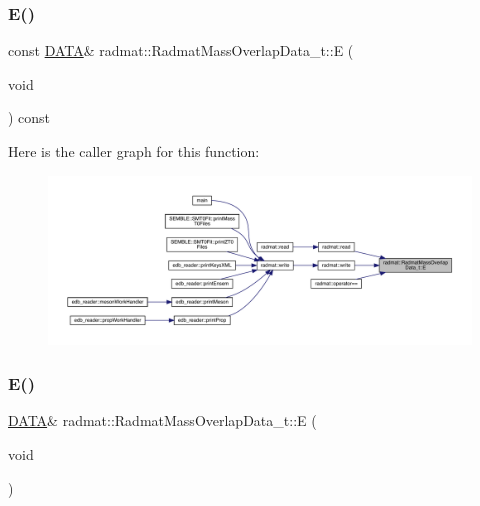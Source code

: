 \subsubsection{\texorpdfstring{E()}{E()}\hspace{0.1cm}{\footnotesize\ttfamily [1/2]}}
{\footnotesize\ttfamily const \mbox{\hyperlink{structradmat_1_1RadmatMassOverlapData__t_ab3de1245b76e79f9867e3af00989e5b6}{D\+A\+TA}}\& radmat\+::\+Radmat\+Mass\+Overlap\+Data\+\_\+t\+::E (\begin{DoxyParamCaption}\item[{void}]{ }\end{DoxyParamCaption}) const\hspace{0.3cm}{\ttfamily [inline]}}

Here is the caller graph for this function\+:
\nopagebreak
\begin{figure}[H]
\begin{center}
\leavevmode
\includegraphics[width=350pt]{d7/d75/structradmat_1_1RadmatMassOverlapData__t_a0789ab137fc29ffcc3a3917d25aec0fb_icgraph}
\end{center}
\end{figure}
\mbox{\label{structradmat_1_1RadmatMassOverlapData__t_a3a27098e8d79fa26e30542418af6a63d}} 
\subsubsection{\texorpdfstring{E()}{E()}\hspace{0.1cm}{\footnotesize\ttfamily [2/2]}}
{\footnotesize\ttfamily \mbox{\hyperlink{structradmat_1_1RadmatMassOverlapData__t_ab3de1245b76e79f9867e3af00989e5b6}{D\+A\+TA}}\& radmat\+::\+Radmat\+Mass\+Overlap\+Data\+\_\+t\+::E (\begin{DoxyParamCaption}\item[{void}]{ }\end{DoxyParamCaption})\hspace{0.3cm}{\ttfamily [inline]}}

